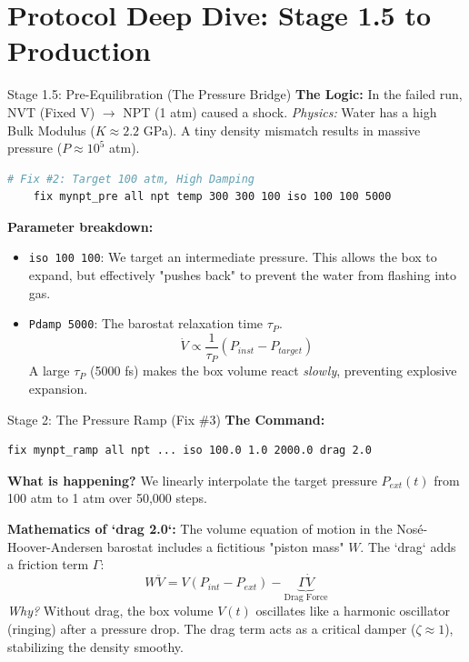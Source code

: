 \documentclass[aspectratio=169, 10pt]{beamer}
\begin{document}
\section{Protocol Deep Dive: Stage 1.5 to Production}

\begin{frame}[fragile]{Stage 1.5: Pre-Equilibration (The Pressure Bridge)}
    \textbf{The Logic:} 
    In the failed run, NVT (Fixed V) $\to$ NPT (1 atm) caused a shock.
    \textit{Physics:} Water has a high Bulk Modulus ($K \approx 2.2$ GPa). A tiny density mismatch results in massive pressure ($P \approx 10^5$ atm).
    
    \begin{lstlisting}[language=bash]
    # Fix #2: Target 100 atm, High Damping
    fix mynpt_pre all npt temp 300 300 100 iso 100 100 5000
    \end{lstlisting}

    \textbf{Parameter breakdown:}
    \begin{itemize}
        \item \texttt{iso 100 100}: We target an intermediate pressure. This allows the box to expand, but effectively "pushes back" to prevent the water from flashing into gas.
        \item \texttt{Pdamp 5000}: The barostat relaxation time $\tau_P$.
        \begin{equation}
            \dot{V} \propto \frac{1}{\tau_P} (P_{inst} - P_{target})
        \end{equation}
        A large $\tau_P$ (5000 fs) makes the box volume react \textit{slowly}, preventing explosive expansion.
    \end{itemize}
\end{frame}

\begin{frame}[fragile]{Stage 2: The Pressure Ramp (Fix \#3)}
    \textbf{The Command:}
    \begin{lstlisting}[language=bash]
    fix mynpt_ramp all npt ... iso 100.0 1.0 2000.0 drag 2.0
    \end{lstlisting}
    
    \textbf{What is happening?}
    We linearly interpolate the target pressure $P_{ext}(t)$ from 100 atm to 1 atm over 50,000 steps.

    \textbf{Mathematics of `drag 2.0`:}
    The volume equation of motion in the Nosé-Hoover-Andersen barostat includes a fictitious "piston mass" $W$. The `drag` adds a friction term $\Gamma$:
    \begin{equation}
        W \ddot{V} = V(P_{int} - P_{ext}) - \underbrace{\Gamma \dot{V}}_{\text{Drag Force}}
    \end{equation}
    \textit{Why?} Without drag, the box volume $V(t)$ oscillates like a harmonic oscillator (ringing) after a pressure drop. The drag term acts as a critical damper ($\zeta \approx 1$), stabilizing the density smoothy.
\end{frame}
\end{document}

